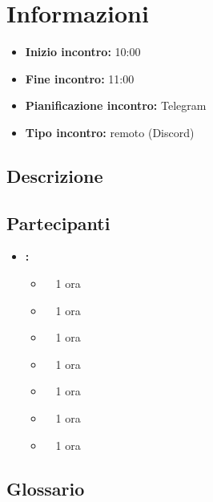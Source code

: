\section{Informazioni}
\begin{itemize}
	\item \textbf{Inizio incontro:} 10:00
	\item \textbf{Fine incontro:} 11:00
	\item \textbf{Pianificazione incontro:} Telegram
	\item \textbf{Tipo incontro:} remoto (Discord)
\end{itemize}

\subsection{Descrizione}
\DocDescription

\subsection{Partecipanti}

\begin{itemize}
	\item \textbf{\GroupName:}
	\begin{itemize}
		\item \tommaso \ \rightarrow\ 1 ora
		\item \marco \ \rightarrow\ 1 ora
		\item \riccardo \ \rightarrow\ 1 ora
		\item \raul \ \rightarrow\ 1 ora
		\item \martina \ \rightarrow\ 1 ora
		\item \sebastiano \ \rightarrow\ 1 ora
		\item \mattia \ \rightarrow\ 1 ora
	\end{itemize}
\end{itemize}

\subsection{Glossario}
\GlossarioIntroduzione

\clearpage